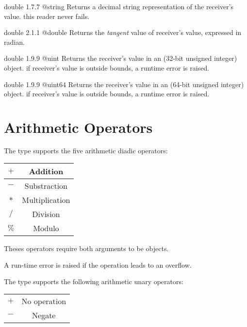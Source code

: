 {double}
{1.7.7}
{@string}
{Returns a decimal string representation of the receiver's value.}
{this reader never fails.}




{double}
{2.1.1}
{@double}
{Returns the \emph{tangent} value of receiver's value, expressed in radian.}
{}







{double}
{1.9.9}
{@uint}
{Returns the receiver's value in an  (32-bit unsigned integer) object.}
{if receiver's value is outside  bounds, a runtime error is raised.}





{double}
{1.9.9}
{@uint64}
{Returns the receiver's value in an  (64-bit unsigned integer) object.}
{if receiver's value is outside  bounds, a runtime error is raised.}




\section{Arithmetic Operators}

The  type supports the five arithmetic diadic operators:\newline

\begin{tabular}{|c|c|}
\hline
$+$ & Addition \\
\hline
$-$ & Substraction \\
\hline
$*$ & Multiplication \\
\hline
$/$ & Division \\
\hline
$\%$ & Modulo \\
\hline
\end{tabular}

Theses operators require both arguments to be  objects.\newline

A run-time error is raised if the operation leads to an overflow.

The  type supports the following arithmetic unary operators:\newline

\begin{tabular}{|c|c|}
\hline
$+$ & No operation \\
$-$ & Negate \\
\hline
\end{tabular}

